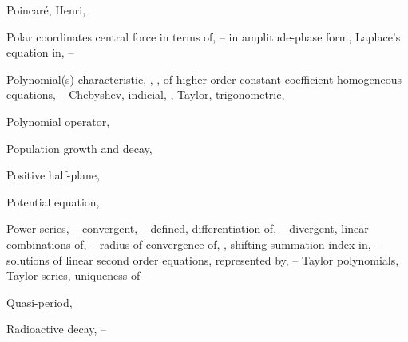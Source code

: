 \begin{theindex}
  \item Poincar\'{e}, Henri, \pageref{eq:4.4.4}

  \item Polar coordinates
    \subitem central force in terms of, \pageref{eq:6.4.1}--\pageref{thmtype:6.4.1}
    \subitem in amplitude-phase form, \pageref{eq:6.1.10}
    \subitem Laplace's equation in, \pageref{eq:12.4.1}--\pageref{exer:12.4.7}

  \item Polynomial(s)
    \subitem characteristic, \pageref{eq:5.2.2}, \pageref{exer:7.3.30}, \pageref{exer:9.2.2}
      \subsubitem of higher order constant coefficient homogeneous equations, \pageref{eq:9.2.2}--\pageref{eq:9.2.9}
    \subitem Chebyshev, \pageref{eq:7.2.16}
    \subitem indicial, \pageref{eq:7.4.7}, \pageref{thmtype:7.5.3}
    \subitem Taylor, \pageref{thmtype:7.1.6}
    \subitem trigonometric, \pageref{exer:11.2.30}

  \item Polynomial operator, \pageref{eq:9.2.2}

  \item Population growth and decay, \pageref{eq:1.1.1}

  \item Positive half-plane, \pageref{eq:10.5.21}

  \item Potential equation, \pageref{eq:12.3.2}

  \item Power series, \pageref{thmtype:7.1.1}--\pageref{exer:7.1.25}
    \subitem convergent, \pageref{thmtype:7.1.1}--\pageref{example:7.1.1}
    \subitem defined, \pageref{thmtype:7.1.1}
    \subitem differentiation of, \pageref{thmtype:7.1.4}--\pageref{eq:7.1.9}
    \subitem divergent, \pageref{thmtype:7.1.1}
    \subitem linear combinations of, \pageref{example:7.1.5}--\pageref{exer:7.1.1}
    \subitem radius of convergence of, \pageref{thmtype:7.1.2}, \pageref{thmtype:7.1.3}
    \subitem shifting summation index in, \pageref{eq:7.1.10}--\pageref{example:7.1.4}
    \subitem solutions of linear second order equations, represented by, \pageref{eq:7.2.1}--\pageref{exer:7.3.49}
    \subitem Taylor polynomials, \pageref{thmtype:7.1.5}
    \subitem Taylor series, \pageref{eq:7.1.2}
    \subitem uniqueness of \pageref{thmtype:7.1.5}--\pageref{thmtype:7.1.6} 

  \item Quasi-period, \pageref{eq:6.2.3} 

  \item Radioactive decay, \pageref{eq:4.1.2}--\pageref{eq:4.1.7}


\end{theindex}
